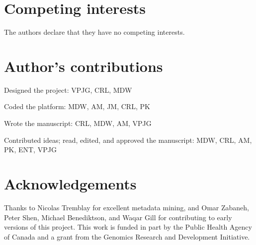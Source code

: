 \documentclass[doublespacing, linenumbers]{bmcart}
\begin{document}

\begin{backmatter}

\section*{Competing interests}
  The authors declare that they have no competing interests.

\section*{Author's contributions}
Designed the project: VPJG, CRL, MDW

Coded the platform: MDW, AM, JM, CRL, PK

Wrote the manuscript: CRL, MDW, AM, VPJG

Contributed ideas; read, edited, and approved the manuscript: MDW, CRL, AM, PK, ENT, VPJG

\section*{Acknowledgements}
Thanks to Nicolas Tremblay for excellent metadata mining, and Omar Zabaneh, Peter Shen, Michael Benediktson, and Waqar Gill for contributing to early versions of this project.  This work is funded in part by the Public Health Agency of Canada and a grant from the Genomics Research and Development Initiative.


\end{backmatter}
\end{document}
